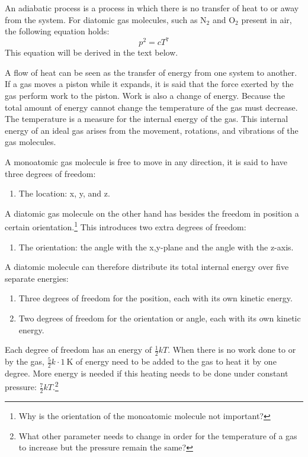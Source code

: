 An adiabatic process is a process in which there is no transfer of heat to or away from the system. For diatomic gas molecules, such as N$_2$ and O$_2$ present in air, the following equation holds:
\begin{equation}
p^2=cT^7
\end{equation}
This equation will be derived in the text below.

A flow of heat can be seen as the transfer of energy from one system to another. If a gas moves a piston while it expands, it is said that the force exerted by the gas perform work to the piston. Work is also a change of energy. Because the total amount of energy cannot change the temperature of the gas must decrease. The temperature is a measure for the internal energy of the gas. This internal energy of an ideal gas arises from the movement, rotations, and vibrations of the gas molecules.

A monoatomic gas molecule is free to move in any direction, it is said to have three degrees of freedom:
\begin{enumerate}[-]
\item The location: x, y, and z.
\end{enumerate}
A diatomic gas molecule on the other hand has besides the freedom in position a certain orientation.\footnote{Why is the orientation of the monoatomic molecule not important?} This introduces two extra degrees of freedom:
\begin{enumerate}[-]
\item The orientation: the angle with the x,y-plane and the angle with the z-axis.
\end{enumerate}
A diatomic molecule can therefore distribute its total internal energy over five separate energies:
\begin{enumerate}[-]
\item Three degrees of freedom for the position, each with its own kinetic energy.
\item Two degrees of freedom for the orientation or angle, each with its own kinetic energy.
\end{enumerate}
Each degree of freedom has an energy of $\frac{1}{2}kT$. When there is no work done to or by the gas, $\frac{5}{2}k\cdot1~\mbox{K}$ of energy need to be added to the gas to heat it by one degree. More energy is needed if this heating needs to be done under constant pressure: $\frac{7}{2}kT$.\footnote{What other parameter needs to change in order for the temperature of a gas to increase but the pressure remain the same?}

